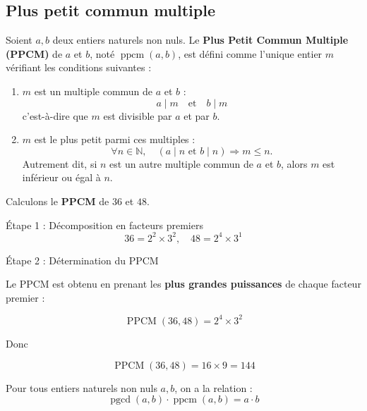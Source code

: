 \subsection{Plus petit commun multiple}

\begin{definition}
    Soient \( a, b \) deux entiers naturels non nuls. Le \textbf{Plus Petit Commun Multiple (PPCM)} de \( a \) et \( b \), noté \( \operatorname{ppcm}(a, b) \), est défini comme l'unique entier \( m \) vérifiant les conditions suivantes :
    \begin{enumerate}
        \item \( m \) est un multiple commun de \( a \) et \( b \) :
        \[
        a \mid m \quad \text{et} \quad b \mid m
        \]
        c'est-à-dire que \( m \) est divisible par \( a \) et par \( b \).
    
        \item \( m \) est le plus petit parmi ces multiples :
        \[
        \forall n \in \mathbb{N}, \quad (a \mid n \text{ et } b \mid n) \Rightarrow m \leq n.
        \]
        Autrement dit, si \( n \) est un autre multiple commun de \( a \) et \( b \), alors \( m \) est inférieur ou égal à \( n \).
    \end{enumerate}
\end{definition}

\begin{exemple}
    Calculons le \textbf{PPCM} de \( 36 \) et \( 48 \).
    
    Étape 1 : Décomposition en facteurs premiers
    \[
    36 = 2^2 \times 3^2, \quad 48 = 2^4 \times 3^1
    \]
    
    Étape 2 : Détermination du PPCM
    
    Le PPCM est obtenu en prenant les \textbf{plus grandes puissances} de chaque facteur premier :
    
    \[
    \operatorname{PPCM}(36, 48) = 2^4 \times 3^2
    \]
    
    Donc
    
    \[
    \operatorname{PPCM}(36, 48) = 16 \times 9 = 144
    \]
\end{exemple}

\begin{proposition}
    Pour tous entiers naturels non nuls \( a, b \), on a la relation :
    \[
     \operatorname{pgcd}(a, b) \cdot\operatorname{ppcm}(a, b) = a\cdot b
    \]
\end{proposition}

